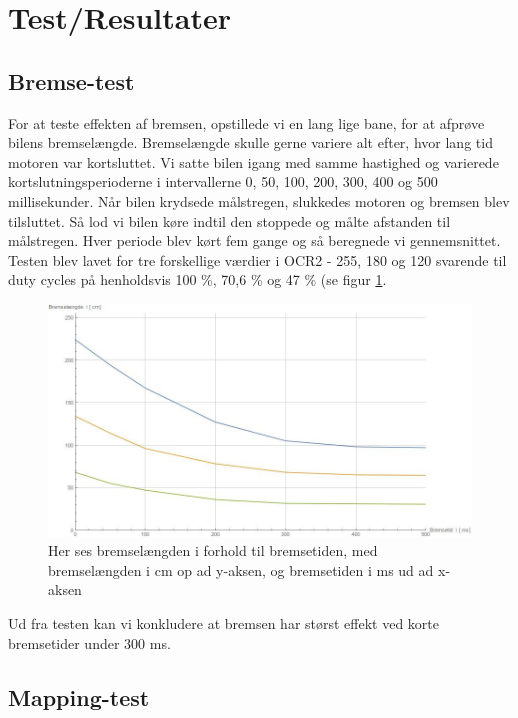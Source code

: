 \section{Test/Resultater}

\subsection{Bremse-test}

For at teste effekten af bremsen, opstillede vi en lang lige bane, for at afprøve bilens bremselængde. Bremselængde skulle gerne variere alt efter, hvor lang tid motoren var kortsluttet. Vi satte bilen igang med samme hastighed og varierede kortslutningsperioderne i intervallerne 0, 50, 100, 200, 300, 400 og 500 millisekunder. Når bilen krydsede målstregen, slukkedes motoren og bremsen blev tilsluttet. Så lod vi bilen køre indtil den stoppede og målte afstanden til målstregen. Hver periode blev kørt fem gange og så beregnede vi gennemsnittet. Testen blev lavet for tre forskellige værdier i OCR2 - 255, 180 og 120 svarende til duty cycles på henholdsvis 100 \%, 70,6 \% og 47 \% (se figur \ref{fig:Bremselir}. 

\begin{figure}[h]

	\centering
		\includegraphics[scale=0.4]{Billeder/Bremse.jpeg}
	\caption{Her ses bremselængden i forhold til bremsetiden, med bremselængden i cm op ad y-aksen, og bremsetiden i ms ud ad x-aksen}
	\label{fig:Bremselir}
	
\end{figure}

Ud fra testen kan vi konkludere at bremsen har størst effekt ved korte bremsetider under 300 ms.

\subsection{Mapping-test}

